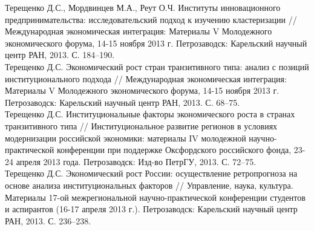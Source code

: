 \documentclass[10pt]{article}
\newcommand{\years}[1]{\marginnote{\scriptsize #1}}
\begin{document}
\years{2013}Терещенко Д.С., Мордвинцев М.А., Реут О.Ч. Институты инновационного предпринимательства: исследовательский подход к изучению кластеризации // Международная экономическая интеграция: Материалы V Молодежного экономического форума, 14-15 ноября 2013 г. Петрозаводск: Карельский научный центр РАН, 2013. С. 184–190.\\
\years{2013}Терещенко Д.С. Экономический рост стран транзитивного типа: анализ с позиций институционального подхода // Международная экономическая интеграция: Материалы V Молодежного экономического форума, 14-15 ноября 2013 г. Петрозаводск: Карельский научный центр РАН, 2013. С. 68–75.\\
\years{2013}Терещенко Д.С. Институциональные факторы экономического роста в странах транзитивного типа // Институциональное развитие регионов в условиях модернизации российской экономики: материалы IV молодежной научно-практической конференции при поддержке Оксфордского российского фонда, 23-24 апреля 2013 года. Петрозаводск: Изд-во ПетрГУ, 2013. С. 72–75.\\
\years{2013}Терещенко Д.С. Экономический рост России: осуществление ретропрогноза на основе анализа институциональных факторов // Управление, наука, культура. Материалы 17-ой межрегиональной научно-практической конференции студентов и аспирантов (16-17 апреля 2013 г.). Петрозаводск: Карельский научный центр РАН, 2013. С. 236–238.\\
\end{document}
